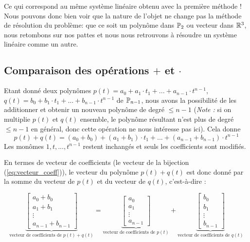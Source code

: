 Ce qui correspond au même système linéaire obtenu avec la première méthode ! Nous pouvons donc bien voir que la nature de l'objet ne change pas la méthode de résolution du problème: que ce soit un polynôme dans $\P_2$ ou vecteur dans $\R^3$, nous retombons sur nos pattes et nous nous retrouvons à résoudre un système linéaire comme un autre.

\subsection{Comparaison des opérations $+$ et $\cdot$}

Etant donné deux polynômes $p(t) = a_0 + a_1 \cdot t_1 + ... + a_{n-1} \cdot t^{n-1}$, $q(t) = b_0 + b_1 \cdot t_1 + ... + b_{n-1} \cdot t^{n-1}$ de $\P_{n-1}$, nous avons la possibilité de les additionner et obtenir un nouveau polynôme de degré $\leq n-1$ (\textit{Note :} si on multiplie $p(t)$ et $q(t)$ ensemble, le polynôme résultant n'est plus de degré $\leq n-1$ en général, donc cette opération ne nous intéresse pas ici). Cela donne 
$$p(t) + q(t) = (a_0 + b_0) + (a_1 + b_1) \cdot t_1 + ... + (a_{n-1} + b_{n-1}) \cdot t^{n-1}$$
Les monômes $1, t, ..., t^{n-1}$ restent inchangés et seuls les coefficients sont modifiés.

En termes de vecteur de coefficients (le vecteur de la bijection (\ref{eq:vecteur_coeff})), le vecteur du polynôme $p(t) + q(t)$ est donc donné par la somme du vecteur de $p(t)$ et du vecteur de $q(t)$, c'est-à-dire :

$$\underbrace{\begin{bmatrix}
a_0 + b_0 \\ a_1 + b_1 \\ \vdots \\ a_{n-1} + b_{n-1}
\end{bmatrix}}_{\text{vecteur de coefficients de } p(t) + q(t)} =
\underbrace{\begin{bmatrix}
a_0 \\ a_1 \\ \vdots \\ a_{n-1}
\end{bmatrix}}_{\text{vecteur de coefficients de } p(t)} +
\underbrace{\begin{bmatrix}
b_0 \\  b_1 \\ \vdots \\ b_{n-1}
\end{bmatrix}}_{\text{vecteur de coefficients de } q(t)}$$

